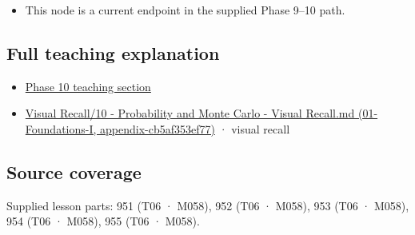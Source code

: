 \begin{itemize}
\tightlist
\item
  This node is a current endpoint in the supplied Phase 9--10 path.
\end{itemize}

\subsection{Full teaching explanation}\label{appendix-33237f0f618b-full-teaching-explanation}

\begin{itemize}
\tightlist
\item
  \hyperref[02-foundations-ii-ch030-finite-samples-need-stable-descriptive-statistics]{Phase 10 teaching section}
\item
  \href{../01-Foundations-I/main.pdf\#nameddest=appendix-cb5af353ef77}{Visual Recall/10 - Probability and Monte Carlo - Visual Recall.md (01-Foundations-I, appendix-cb5af353ef77)} · visual recall
\end{itemize}

\subsection{Source coverage}\label{appendix-33237f0f618b-source-coverage}

Supplied lesson parts: 951 (T06 · M058), 952 (T06 · M058), 953 (T06 · M058), 954 (T06 · M058), 955 (T06 · M058).
